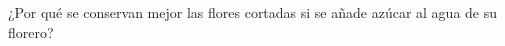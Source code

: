 ¿Por qué se conservan mejor las flores cortadas si se
añade azúcar al agua de su florero?

\begin{solutionbox}{3cm}

\end{solutionbox}